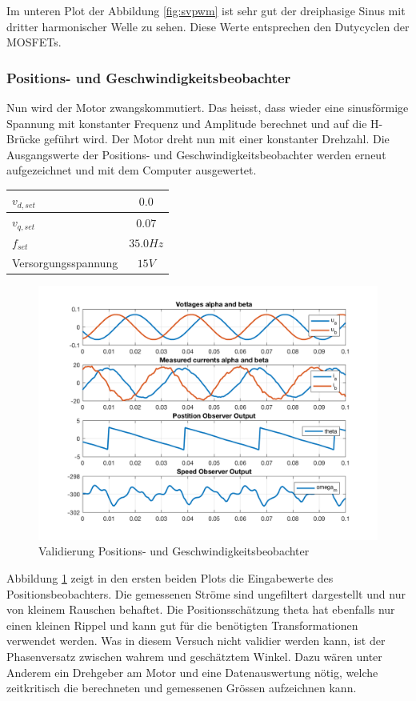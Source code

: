 Im unteren Plot der Abbildung \ref{fig:svpwm} ist sehr gut der dreiphasige Sinus mit dritter harmonischer Welle zu sehen. Diese Werte entsprechen den Dutycyclen der MOSFETs.

\subsubsection*{Positions- und Geschwindigkeitsbeobachter} \label{val:obs}
Nun wird der Motor zwangskommutiert. Das heisst, dass wieder eine sinusförmige Spannung mit konstanter Frequenz und Amplitude berechnet und auf die H-Brücke geführt wird. Der Motor dreht nun mit einer konstanter Drehzahl. Die Ausgangswerte der Positions- und Geschwindigkeitsbeobachter werden erneut aufgezeichnet und mit dem Computer ausgewertet.

\begin{center}
	\begin{tabular}{l|c}
		\hline 
		$v_{d,set}$ & $0.0$ \\ \hline
		$v_{q,set}$ & $0.07$ \\ \hline
		$f_{set}$ & $35.0Hz$ \\ \hline
		Versorgungsspannung & $15V$ \\ \hline
	\end{tabular} 
	\label{tab:obsmessbed}
\end{center}

\begin{figure} [H]
	\centering
	\includegraphics[width=0.8\linewidth]{images/valmcobserver.png}
	\caption{Validierung Positions- und Geschwindigkeitsbeobachter}
	\label{fig:observer}
\end{figure}

Abbildung \ref{fig:observer} zeigt in den ersten beiden Plots die Eingabewerte des Positionsbeobachters. Die gemessenen Ströme sind ungefiltert dargestellt und nur von kleinem Rauschen behaftet. Die Positionsschätzung theta hat ebenfalls nur einen kleinen Rippel und kann gut für die benötigten Transformationen verwendet werden.
Was in diesem Versuch nicht validier werden kann, ist der Phasenversatz zwischen wahrem und geschätztem Winkel. Dazu wären unter Anderem ein Drehgeber am Motor und eine Datenauswertung nötig, welche zeitkritisch die berechneten und gemessenen Grössen aufzeichnen kann.

